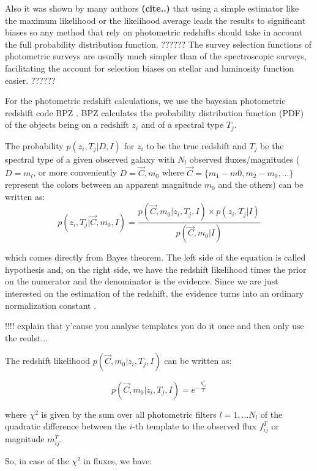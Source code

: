 \documentclass[9pt]{memoir}
\begin{document}
Also it was shown by many authors \textbf{(cite..)} that using a simple estimator like the maximum likelihood or the likelihood average leads the results to significant biases so any method that rely on photometric redshifts should take in account the full probability distribution function. 
??????
The survey selection functions of photometric surveys are usually much simpler than of the spectroscopic surveys, facilitating the account for selection biases on stellar and luminosity function easier.
??????


For the photometric redshift calculations, we use the bayesian photometric redshift code BPZ \citep{Benitez.2000a}. BPZ calculates the probability distribution function (PDF) of the objects being on a redshift $z_i$ and of a spectral type $T_j$.

The probability $p(z_i, T_j|D,I)$ for $z_i$ to be the true redshift and $T_j$ be the spectral type of a given observed galaxy with $N_l$ observed fluxes/magnitudes ($D = m_l$, or more conveniently $D = \vec{C}, m_0$ where $\vec{C} = \{m_1 - m0, m_2 - m_0, \ldots\}$ represent the colors between an apparent magnitude $m_0$ and the others)  can be written as:
\begin{equation}
p(z_i,T_j|\vec{C}, m_0,  I) = \frac{p(\vec{C}, m_0|z_i,T_j,I) \times p(z_i, T_j|I)}{p(\vec{C}, m_0|I)}
\end{equation}

\noindent which comes directly from Bayes theorem. The left side of the equation is called hypothesis and, on the right side, we have the redshift likelihood times the prior on the numerator and the denominator is the evidence. Since we are just interested on the estimation of the redshift, the evidence turns into an ordinary normalization constant \citep{Sivia.Skilling.2006}.

!!!! explain that y'cause you analyse templates you do it once and then only use the reulst...


The redshift likelihood $p(\vec{C}, m_0|z_i,T_j,I)$ can be written as:

\begin{equation}
p(\vec{C}, m_0|z_i,T_j,I) = e^{-\frac{\chi_{ij}^2}{2}}
\end{equation}

\noindent where $\chi^2$ is given by the sum over all photometric filters $l = 1, \ldots N_l$ of the quadratic difference between the $i$-th template to the observed flux $f^T_{ij}$ or magnitude $m^T_{ij}$.

So, in case of the $\chi^2$ in fluxes, we have:
\end{document}
